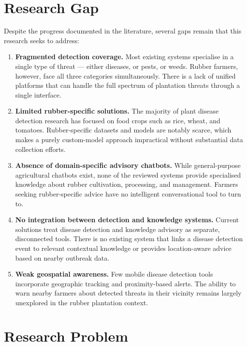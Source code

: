 \section{Research Gap}

Despite the progress documented in the literature, several gaps remain that this research seeks to address:

\begin{enumerate}[label=\arabic*.]
    \item \textbf{Fragmented detection coverage.} Most existing systems specialise in a single type of threat --- either diseases, or pests, or weeds. Rubber farmers, however, face all three categories simultaneously. There is a lack of unified platforms that can handle the full spectrum of plantation threats through a single interface.

    \item \textbf{Limited rubber-specific solutions.} The majority of plant disease detection research has focused on food crops such as rice, wheat, and tomatoes. Rubber-specific datasets and models are notably scarce, which makes a purely custom-model approach impractical without substantial data collection efforts.

    \item \textbf{Absence of domain-specific advisory chatbots.} While general-purpose agricultural chatbots exist, none of the reviewed systems provide specialised knowledge about rubber cultivation, processing, and management. Farmers seeking rubber-specific advice have no intelligent conversational tool to turn to.

    \item \textbf{No integration between detection and knowledge systems.} Current solutions treat disease detection and knowledge advisory as separate, disconnected tools. There is no existing system that links a disease detection event to relevant contextual knowledge or provides location-aware advice based on nearby outbreak data.

    \item \textbf{Weak geospatial awareness.} Few mobile disease detection tools incorporate geographic tracking and proximity-based alerts. The ability to warn nearby farmers about detected threats in their vicinity remains largely unexplored in the rubber plantation context.
\end{enumerate}


\section{Research Problem}

